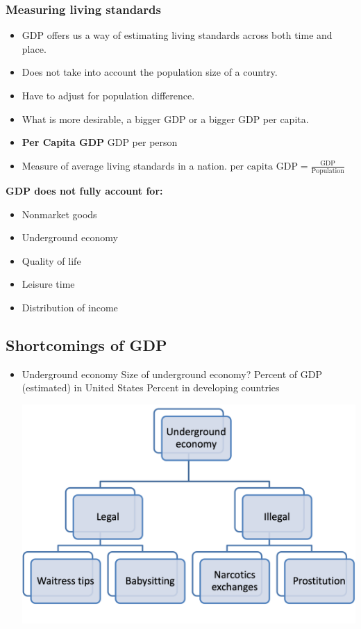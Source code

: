 \documentclass[12pt]{article} %
\begin{document}
\subsubsection{Measuring living standards}
\begin{itemize}
\item GDP offers us a way of estimating living standards across both time and place.
\item Does not take into account the population size of a country.
\item Have to adjust for population difference.
\item What is more desirable, a bigger GDP or a bigger GDP per capita.
\item \textbf{Per Capita GDP}
\subitem GDP per person
\item Measure of average living standards in a nation. \(\text{per capita GDP}=\frac{\text{GDP}}{\text{Population}}\)
\end{itemize}

\textbf{GDP does not fully account for:}
\begin{itemize}
\item Nonmarket goods
\item Underground economy
\item Quality of life
\item Leisure time
\item Distribution of income
\end{itemize}
\subsection{Shortcomings of GDP}
\begin{itemize}
\item Underground economy
\subitem Size of underground economy?
\subsubitem Percent of GDP (estimated) in United States
\subsubitem Percent in developing countries
\begin{center}
\includegraphics[scale=0.5]{../images/Picture14.png}
\end{center}
\end{itemize}
\end{document}
